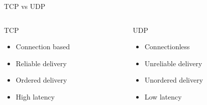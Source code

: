 \begin{frame}[t]{TCP vs UDP}

\vspace{-1cm}

\begin{columns}[t]
  \begin{column}{.5\textwidth}
    \begin{block}{}
    \large{TCP}

    \begin{itemize}
        \item Connection based
        \item Reliable delivery
        \item Ordered delivery
        \item High latency
    \end{itemize}
    \end{block}
\end{column}
  \begin{column}{.5\textwidth}
    \begin{block}{}
    \large{UDP}
    \begin{itemize}
        \item Connectionless
        \item Unreliable delivery
        \item Unordered delivery
        \item Low latency
    \end{itemize}
    \end{block}
  \end{column}
\end{columns}

\end{frame}